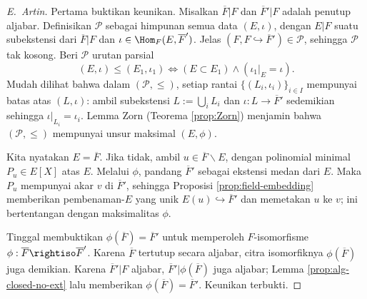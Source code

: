 \begin{proof}[E.\ Artin]
	Pertama buktikan keunikan. Misalkan $\overline{F}|F$ dan $\overline{F}'|F$ adalah penutup aljabar. Definisikan $\mathcal{P}$ sebagai himpunan semua data $(E, \iota)$, dengan $E|F$ suatu subekstensi dari $\overline{F}|F$ dan $\iota \in \Hom_F(E, \overline{F}')$. Jelas $\left( F, F \hookrightarrow \overline{F}' \right) \in \mathcal{P}$, sehingga $\mathcal{P}$ tak kosong. Beri $\mathcal{P}$ urutan parsial
	\[ (E, \iota) \leq (E_1, \iota_1) \iff (E \subset E_1) \wedge (\iota_1|_E = \iota). \]
	Mudah dilihat bahwa dalam $(\mathcal{P}, \leq)$, setiap rantai $\{ (L_i, \iota_i)\}_{i \in I}$ mempunyai batas atas $(L, \iota)$: ambil subekstensi $L := \bigcup_i L_i$ dan $\iota: L \to \overline{F}'$ sedemikian sehingga $\iota|_{L_i} = \iota_i$. Lemma Zorn (Teorema \ref{prop:Zorn}) menjamin bahwa $(\mathcal{P}, \leq)$ mempunyai unsur maksimal $(E, \phi)$.
	
	Kita nyatakan $E=\overline{F}$. Jika tidak, ambil $u \in \overline{F} \smallsetminus E$, dengan polinomial minimal $P_u \in E[X]$ atas $E$. Melalui $\phi$, pandang $\overline{F}'$ sebagai ekstensi medan dari $E$. Maka $P_u$ mempunyai akar $v$ di $\overline{F}'$, sehingga Proposisi \ref{prop:field-embedding} memberikan pembenaman-$E$ yang unik $E(u) \hookrightarrow \overline{F}'$ dan memetakan $u$ ke $v$; ini bertentangan dengan maksimalitas $\phi$.
	
	Tinggal membuktikan $\phi(\overline{F})=\overline{F}'$ untuk memperoleh $F$-isomorfisme $\phi: \overline{F} \rightiso \overline{F}'$. Karena $\overline{F}$ tertutup secara aljabar, citra isomorfiknya $\phi(\overline{F})$ juga demikian. Karena $\overline{F}'|F$ aljabar, $\overline{F}'|\phi(\overline{F})$ juga aljabar; Lemma \ref{prop:alg-closed-no-ext} lalu memberikan $\phi(\overline{F})=\overline{F}'$. Keunikan terbukti.
	

\end{proof}
